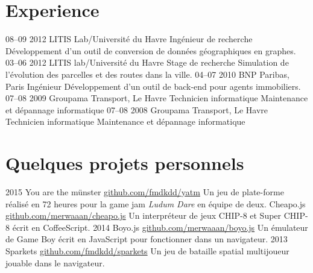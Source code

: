 \documentclass[]{friggeri-cv}
\begin{document}
\section{Experience}

\begin{entrylist}
  \entry
    {08–09 2012}
    {LITIS Lab/Université du Havre}
    {Ingénieur de recherche}
    {Développement d'un outil de conversion de données géographiques en graphes.}
  \entry
    {03–06 2012}
    {LITIS lab/Université du Havre}
    {Stage de recherche}
    {Simulation de l'évolution des parcelles et des routes dans la ville.}
  \entry
    {04–07 2010}
    {BNP Paribas, Paris}
    {Ingénieur}
    {Développement d'un outil de back-end pour agents immobiliers.}
  \entry
    {07–08 2009}
    {Groupama Transport, Le Havre}
    {Technicien informatique}
    {Maintenance et dépannage informatique}
  \entry
    {07–08 2008}
    {Groupama Transport, Le Havre}
    {Technicien informatique}
    {Maintenance et dépannage informatique}
\end{entrylist}

\section{Quelques projets personnels}

\begin{entrylist}
  \entry
    {2015}
    {You are the münster}
    {\href{http://github.com/fmdkdd/yatm}{github.com/fmdkdd/yatm}}
    {Un jeu de plate-forme réalisé en 72 heures pour la game jam \textit{Ludum Dare} en équipe de deux.}
  \entry
    {}
    {Cheapo.js}
    {\href{http://github.com/merwaaan/cheapo.js}{github.com/merwaaan/cheapo.js}}
    {Un interpréteur de jeux CHIP-8 et Super CHIP-8 écrit en CoffeeScript.}
  \entry
    {2014}
    {Boyo.js}
    {\href{http://github.com/merwaaan/boyo.js}{github.com/merwaaan/boyo.js}}
    {Un émulateur de Game Boy écrit en JavaScript pour fonctionner dans un navigateur.}
  \entry
    {2013}
    {Sparkets}
    {\href{http://github.com/fmdkdd/sparkets}{github.com/fmdkdd/sparkets}}
    {Un jeu de bataille spatial multijoueur jouable dans le navigateur.}
\end{entrylist}
\end{document}
